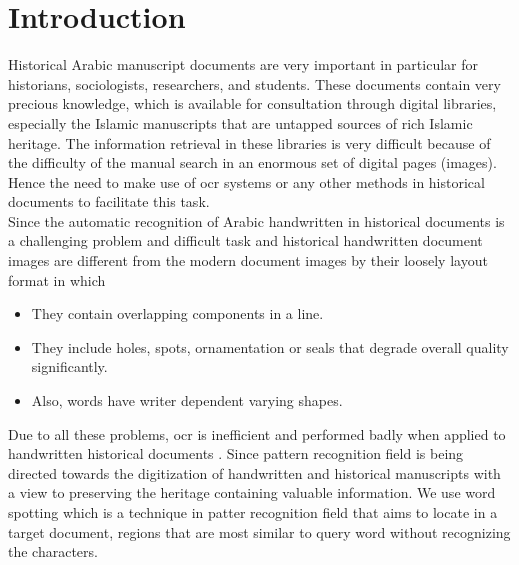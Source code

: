 \chapter{Introduction}


Historical Arabic manuscript documents are very important in particular for historians, sociologists, researchers, and students. These documents contain very precious knowledge, which is available for consultation through digital libraries, especially the Islamic manuscripts that are untapped sources of rich Islamic heritage. The information retrieval in these libraries is very difficult because of the difficulty of the manual search in an enormous set of digital pages (images). Hence the need to make use of \acrfull{ocr} systems or any other methods in historical documents to facilitate this task. \\

Since the automatic recognition of Arabic handwritten in historical documents is a challenging problem and difficult task and historical handwritten document images are different from the modern document images by their loosely layout format in which
\begin{itemize}[itemsep=1pt, topsep=5pt]
    \item They contain overlapping components in a line.
    \item They include holes, spots, ornamentation or seals that degrade overall quality significantly.
    \item Also, words have writer dependent varying shapes.
\end{itemize}

Due to all these problems, \acrfull{ocr} is inefficient and performed badly when applied to handwritten historical documents \cite{Kassis2016AutomaticSO}. Since pattern recognition field is being directed towards the digitization of handwritten and historical manuscripts with a view to preserving the heritage containing valuable information. We use word spotting which is a technique in patter recognition field that aims to locate in a target document, regions that are most similar to query word without recognizing the characters. \\

